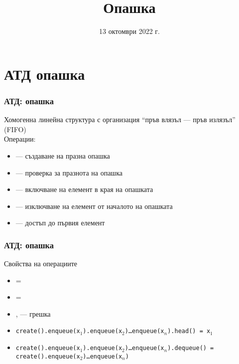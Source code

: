 \documentclass[alsotrans]{beamerswitch}
\title{Опашка}
\date{13 октомври 2022 г.}
\begin{document}
\begin{frame}
  \titlepage
\end{frame}

\section{АТД опашка}

\begin{frame}
  \frametitle{АТД: опашка}

  Хомогенна линейна структура с организация ``пръв влязъл --- пръв излязъл'' (FIFO)\\[2ex]
  Операции:\\[1ex]
  \begin{itemize}
  \item {} --- създаване на празна опашка
  \item {} --- проверка за празнота на опашка
  \item {} --- включване на елемент в края на опашката
  \item {} --- изключване на елемент от началото на опашката
  \item {} --- достъп до първия елемент
  \end{itemize}
\end{frame}

\begin{frame}
  \frametitle{АТД: опашка}

  Свойства на операциите\\[1ex]
  \small
  \begin{itemize}
  \item {} = 
  \item {} = 
  \item {},  --- \alert{грешка}
  \item \tt{create().enqueue(x$_1$).enqueue(x$_2$)\ldots{}enqueue(x$_n$).head() = x$_1$}
  \item \tt{create().enqueue(x$_1$).enqueue(x$_2$)\ldots{}enqueue(x$_n$).dequeue() = create().enqueue(x$_2$)\ldots{}enqueue(x$_n$)}
  \end{itemize}
\end{frame}
\end{document}
